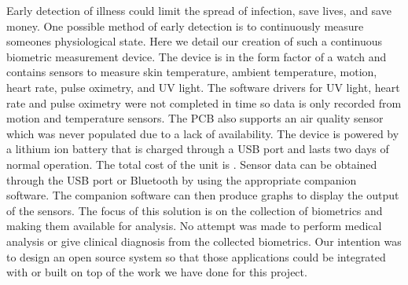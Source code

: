 Early detection of illness could limit the spread of infection, save lives, and
save money.  One possible method of early detection is to continuously measure
someones physiological state.  Here we detail our creation of such a continuous
biometric measurement device.  The device is in the form factor of a watch and
contains sensors to measure skin temperature, ambient temperature, motion, 
heart rate, pulse oximetry, and UV light. The software drivers for UV light,
heart rate and pulse oximetry were not completed in time so data is only
recorded from motion and temperature sensors. The PCB also supports an air
quality sensor which was never populated due to a lack of availability.
The device is powered by a lithium ion battery that is charged
through a USB port and lasts two days of normal operation.  
The total cost of the unit is \costofboard.  Sensor data can be
obtained through the USB port or Bluetooth by using the appropriate companion
software.  The companion software can then produce graphs to display the output
of the sensors.  The focus of this solution is on the collection of biometrics
and making them available for analysis.  No attempt was made to perform medical
analysis or give clinical diagnosis from the collected biometrics.  Our
intention was to design an open source system so that those applications could be
integrated with or built on top of the work we have done for this project.
